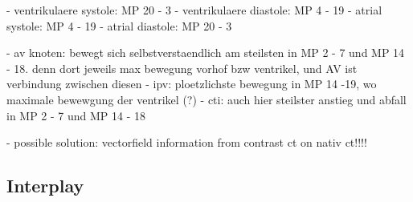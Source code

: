 \documentclass[type=dr, dr=rernat, accentcolor=tud7b,colorbacktitle, bigchapter, openright, twoside, 12pt ]{tudthesis}
\begin{document}
- ventrikulaere systole: MP 20 - 3
- ventrikulaere diastole: MP 4 - 19
- atrial systole: MP 4 - 19
- atrial diastole: MP 20 - 3

- av knoten: bewegt sich selbstverstaendlich am steilsten in MP 2 - 7 und MP 14 - 18. denn dort jeweils max bewegung vorhof bzw ventrikel, und 
AV ist verbindung zwischen diesen
- ipv: ploetzlichste bewegung in MP 14 -19, wo maximale bewewgung der ventrikel (?)
- cti: auch hier steilster anstieg und abfall in MP 2 - 7 und MP 14 - 18

- possible solution: vectorfield information from contrast ct on nativ ct!!!!




\subsection{Interplay}
\end{document}
